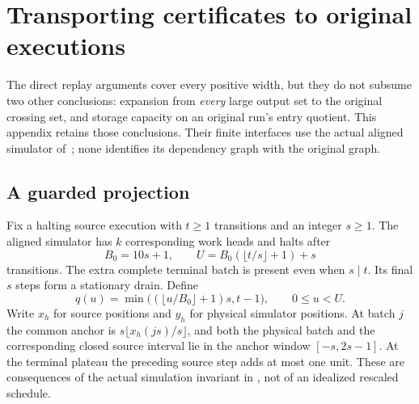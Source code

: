 \section{Transporting certificates to original executions}\label{sec:transfer}

The direct replay arguments cover every positive width, but they do not
subsume two other conclusions: expansion from \emph{every} large output set
to the original crossing set, and storage capacity on an original run's entry
quotient. This appendix retains those conclusions. Their finite interfaces
use the actual aligned simulator of~\cite{HighRateStorage2026}; none identifies
its dependency graph with the original graph.

\subsection{A guarded projection}

Fix a halting source execution with $t\ge1$ transitions and an integer $s\ge1$.
The aligned simulator has $k$ corresponding work heads and halts after
\[
 B_0=10s+1,\qquad U=B_0(\lfloor t/s\rfloor+1)+s
\]
transitions. The extra complete terminal batch is present even when $s\mid t$.
Its final $s$ steps form a stationary drain. Define
\[
 q(u)=\min\bigl((\lfloor u/B_0\rfloor+1)s,t-1\bigr),\qquad 0\le u<U.
\]
Write $x_h$ for source positions and $y_h$ for physical simulator positions.
At batch $j$ the common anchor is
$s\lfloor x_h(js)/s\rfloor$, and both the physical batch and the corresponding
closed source interval lie in the anchor window $[-s,2s-1]$.
At the terminal plateau the preceding source step adds at most one unit.
These are consequences of the actual simulation invariant in
\cite{HighRateStorage2026}, not of an idealized rescaled schedule.

